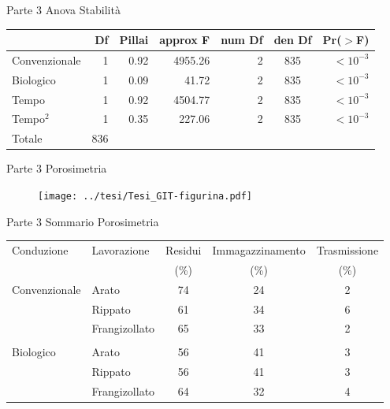 \documentclass[10pt]{beamer}
\begin{document}
\begin{frame}[label=Anova]{Parte 3 \small{Anova Stabilità}}
  \hyperlink{Composizionale}{}
  \footnotesize
  \begin{table}
    \centering
    \begin{tabular}{lrrrrcr}
      \hline
      & Df&Pillai& approx F & num Df & den Df & Pr($>$F) \\ 
      \hline
      Convenzionale & 1 & 0.92 & 4955.26  &      2 &    835 & $<10^{-3}$\\ 
      Biologico     & 1 & 0.09 & 41.72    &      2 &    835 & $<10^{-3}$\\ 
      Tempo         & 1 & 0.92 & 4504.77  &      2 &    835 & $<10^{-3}$\\ 
      Tempo$^2$     & 1 & 0.35 & 227.06   &      2 &    835 & $<10^{-3}$\\ 
      Totale        & 836 &    &          &        &        &          \\ 
      \hline
    \end{tabular}
  \end{table}
\end{frame}

\begin{frame}[label=Porosimetria]{Parte 3 \small{Porosimetria}}
  \hyperlink{finale}{}
  
  \begin{figure}
    \texttt{[image: ../tesi/Tesi\_GIT-figurina.pdf]}
  \end{figure}
\end{frame}

\begin{frame}{Parte 3 \small{Sommario Porosimetria}}

  \footnotesize
  \begin{table}[hb]
    \centering
    \begin{tabular}{llccc}%
      \hline
      Conduzione & Lavorazione & Residui & Immagazzinamento &
                                                              Trasmissione \\ 
                 &             & (\%) &  (\%) &  (\%) \\ 
      \hline
      Convenzionale & Arato & 74 & 24 & 2 \\ 
                 & Rippato & 61 & 34 & 6 \\ 
                 & Frangizollato & 65 & 33 & 2 \\ 
                 &  &  &  &  \\ 
      Biologico & Arato & 56 & 41 & 3 \\ 
                 & Rippato & 56 & 41 & 3 \\ 
                 & Frangizollato & 64 & 32 & 4 \\ 
      \hline
    \end{tabular}
  \end{table}
\end{frame}
\end{document}
